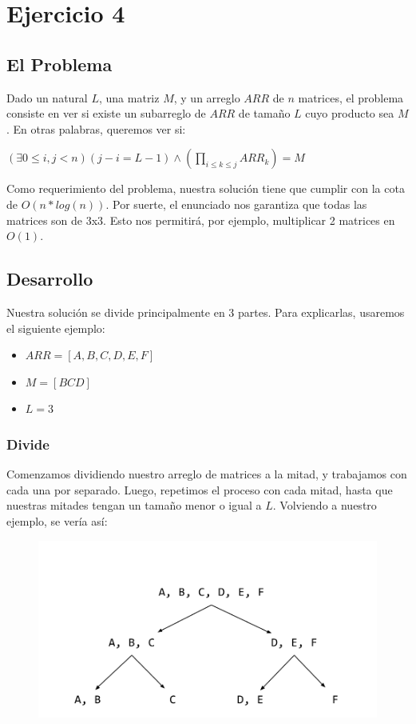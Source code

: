 \section{Ejercicio 4}
\subsection{El Problema}
Dado un natural $L$, una matriz $M$, y un arreglo $ARR$ de $n$ matrices, el problema consiste en ver si existe un subarreglo de $ARR$ de tamaño $L$ cuyo producto sea $M$. En otras palabras, queremos ver si: 

\begin{center}
$(\exists   0 \leq i, j < n) (j - i = L - 1) \land (\displaystyle \prod_{i \leq k \leq j}^{} ARR_{k}) = M$
\end{center}

Como requerimiento del problema, nuestra solución tiene que cumplir con la cota de $O(n * log (n))$.
Por suerte, el enunciado nos garantiza que todas las matrices son de 3x3. Esto nos permitirá, por ejemplo, multiplicar 2 matrices en $O(1)$.
\subsection{Desarrollo}
Nuestra solución se divide principalmente en 3 partes. Para explicarlas, usaremos el siguiente ejemplo:
\begin{itemize}
\item $ARR = [A, B, C, D, E, F]$
\item $M = [BCD]$
\item $L = 3$
\end{itemize}
\subsubsection{Divide}
Comenzamos dividiendo nuestro arreglo de matrices a la mitad, y trabajamos con cada una por separado. Luego, repetimos el proceso con cada mitad, hasta que nuestras mitades tengan un tamaño menor o igual a $L$. Volviendo a nuestro ejemplo, se vería así:
\begin{figure}[H]
\centering
\includegraphics[scale=0.35]{Imagenes/ej4-ejem1}
\end{figure}
